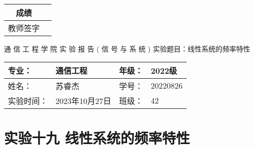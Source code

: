 \documentclass[dvipsnames, svgnames,a4paper,11pt]{article}
\begin{document}
\begin{table}
  \raggedleft
	\renewcommand\arraystretch{1.7}
	\begin{tabular}{|c|p{4em}|}
	  \hline
	  成绩 &  \\
	  \hline
	  教师签字 &   \\
	  \hline
	\end{tabular}
\end{table}

\begin{center}
	{\kaishu \LARGE   \quad  \quad 通  \quad 信  \quad 工  \quad 程  \quad 学  \quad 院 }
  \newline
  \newline
  \newline
  \newline
  \newline
  {\kaishu \Huge 实 \quad  \quad  \quad 验  \quad  \quad  \quad 报 \quad  \quad  \quad 告}
  \newline
  \newline
  \newline
  \newline
  \newline
  {\songti \Huge  ( \quad  信  \quad 号  \quad 与  \quad 系  \quad 统 \quad)}
  \newline
  \newline
  \newline
  \newline
  \newline
  {\songti  \LARGE 实验题目：线性系统的频率特性  \quad  \quad \quad}
\end{center}



\begin{table}[b]
	\renewcommand\arraystretch{1.7}
	\begin{tabularx}{\textwidth}{|X|X|X|X|}
	  \hline
	  专业：& 通信工程 &年级：& 2022级\\
	  \hline
	  姓名：& 苏睿杰  & 学号：& 20220826\\
	  \hline
	  实验时间：& 2023年10月27日 & 班级：& 42 \\
	  \hline
	\end{tabularx}
\end{table}



\clearpage
\setcounter{section}{0}
\section{实验十九 \quad 线性系统的频率特性}
	
\end{document}
